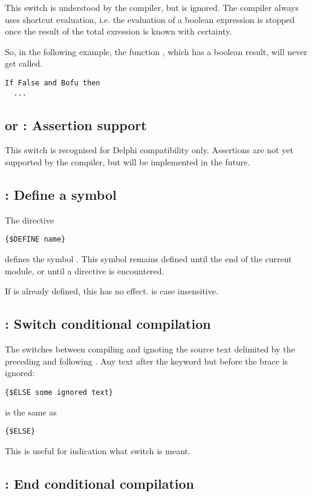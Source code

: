 \documentclass{report}
\begin{document}
This switch is understood by the \fpc compiler, but is ignored. The compiler
always uses shortcut evaluation, i.e. the evaluation of a boolean expression
is stopped once the result of the total exression is known with certainty.

So, in the following example, the function , which has a boolean
result, will never get called.
\begin{verbatim}
If False and Bofu then
  ...
\end{verbatim}

\subsection{ or  : Assertion support}

This switch is recognised for Delphi compatibility only. Assertions are not
yet supported by the compiler, but will be implemented in the future.

\subsection{ : Define a symbol}

The directive
\begin{verbatim}
{$DEFINE name}
\end{verbatim}
defines the symbol . This symbol remains defined until the end of
the current module, or until a  directive is encountered.

If  is already defined, this has no effect.  is case
insensitive.


\subsection{ : Switch conditional compilation}

The  switches between compiling and ignoting the source
text delimited by the preceding  and following 
. Any text after the  keyword but before the 
brace is ignored: 
\begin{verbatim}
{$ELSE some ignored text}
\end{verbatim}
is the same as
\begin{verbatim}
{$ELSE}
\end{verbatim}
This is useful for indication what switch is meant.

\subsection{ : End conditional compilation}
\end{document}
